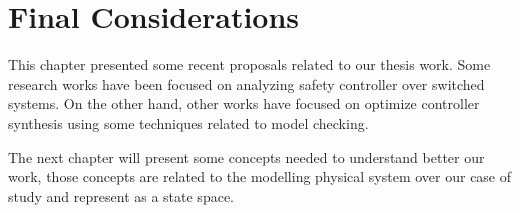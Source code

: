 \section{Final Considerations}
This chapter presented some recent proposals related to our thesis work. Some research works have been focused on analyzing safety controller over switched systems. On the other hand, other works have focused on optimize controller synthesis using some techniques related to model checking. 

The next chapter will present some concepts needed to understand better our work, those concepts are related to the modelling physical system over our case of study and represent as a state space.
